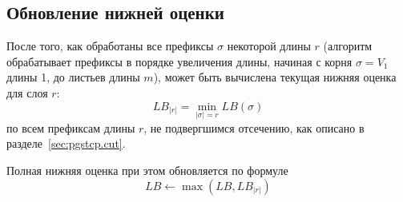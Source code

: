 
\subsection{Обновление нижней оценки}
\label{sec:pgstcp.upd}

После того, как
обработаны все префиксы
$\sigma$
некоторой длины $r$
(алгоритм обрабатывает
префиксы в порядке увеличения длины,
начиная с корня
$\sigma = V_1$
длины 1,
до листьев длины $m$),
может быть вычислена текущая
нижняя оценка для слоя $r$:
\begin{equation}
  \label{eq:pcgtsp.lb.layer}
  LB_{|r|}=\min_{|\sigma|=r} LB(\sigma)
\end{equation}
по всем префиксам длины $r$,
не подвергшимся отсечению,
как описано в разделе~\ref{sec:pgstcp.cut}.

Полная нижняя оценка при этом обновляется по формуле
\begin{equation}
  \label{eq:pcgtsp.lb.total}
  LB \gets \max(LB, LB_{|r|})
\end{equation}
